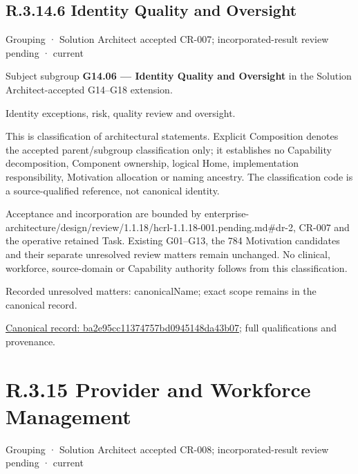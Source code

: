 \subsection*{R.3.14.6 Identity Quality and Oversight}
\label{navigation:R.3.14.6}

\label{element:ba2e95cc11374757bd0945148da43b07}
{\small Grouping · Solution Architect accepted CR-007; incorporated-result review pending · current}\par

Subject subgroup \textbf{G14.06 — Identity Quality and Oversight} in the Solution Architect-accepted G14–G18 extension.



Identity exceptions, risk, quality review and oversight.



This is classification of architectural statements. Explicit Composition denotes the accepted parent/subgroup classification only; it establishes no Capability decomposition, Component ownership, logical Home, implementation responsibility, Motivation allocation or naming ancestry. The classification code is a source-qualified reference, not canonical identity.



Acceptance and incorporation are bounded by enterprise-architecture/design/review/1.1.18/hcrl-1.1.18-001.pending.md\#dr-2, CR-007 and the operative retained Task. Existing G01–G13, the 784 Motivation candidates and their separate unresolved review matters remain unchanged. No clinical, workforce, source-domain or Capability authority follows from this classification.


{\small Recorded unresolved matters: canonicalName; exact scope remains in the canonical record.}\par
{\footnotesize \href{../../../../continuum/grouping/ba2e95cc11374757bd0945148da43b07.md}{Canonical record: ba2e95cc11374757bd0945148da43b07}; full qualifications and provenance.}\par
\section*{R.3.15 Provider and Workforce Management}
\label{navigation:R.3.15}

\label{element:fd9d0fa7117a4dc3b45cfed0e7be614b}
{\small Grouping · Solution Architect accepted CR-008; incorporated-result review pending · current}\par

